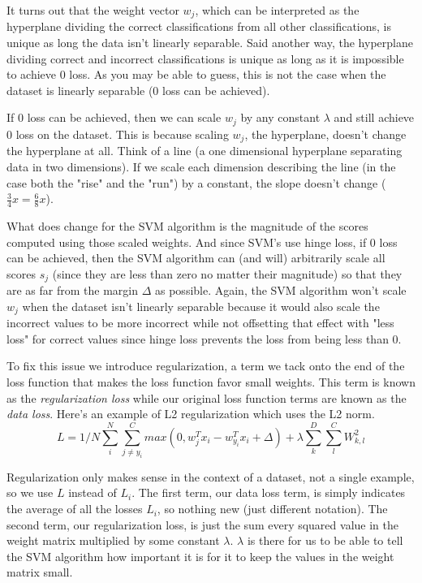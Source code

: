 \documentclass[12pt]{article}
\begin{document}
It turns out that the weight vector $w_j$, which can be interpreted as the hyperplane dividing
the correct classifications from all other classifications, is unique as long the data
isn't linearly separable. Said another way, the hyperplane dividing correct and incorrect 
classifications is unique as long as it is impossible to achieve 0 loss.
As you may be able to guess, this is not the case when the dataset is linearly 
separable (0 loss can be achieved). 

If 0 loss can be achieved, then we can scale $w_j$ by any constant $\lambda$ and still
achieve 0 loss on the dataset. This is because scaling $w_j$, the hyperplane, doesn't change
the hyperplane at all. Think of a line (a one dimensional hyperplane separating data
in two dimensions). If we scale each dimension describing the line (in the case both the "rise"
and the "run") by a constant, the slope doesn't change ($\frac{3}{4}x = \frac{6}{8}x$).

What does change for the SVM algorithm is the magnitude of the scores computed using
those scaled weights. And since SVM's use hinge loss, if 0 loss can be achieved, 
then the SVM algorithm can (and will) arbitrarily scale all scores $s_j$ (since they are less
than zero no matter their magnitude) so that they are as far from the margin $\Delta$ 
as possible. Again, the SVM algorithm won't scale $w_j$ when the dataset isn't linearly 
separable because it would also scale the incorrect values to be more incorrect while not 
offsetting that effect with "less loss" for correct values since hinge loss prevents the 
loss from being less than 0. 

To fix this issue we introduce regularization, a term we tack onto the end of the loss function
that makes the loss function favor small weights. This term is known as the \emph{regularization 
loss} while our original loss function terms are known as the \emph{data loss}. 
Here's an example of L2 regularization which uses the L2 norm. 
\begin{equation}
    L = 1/N \sum_{i}^N \sum_{j \neq y_{i}}^C max(0, w_{j}^T x_i - w_{y_i}^T x_i + \Delta)
    + \lambda \sum_{k}^D \sum_{l}^C W_{k, l}^2
\end{equation}

Regularization only makes sense in the context of a dataset, not a single example, 
so we use $L$ instead of $L_i$. The first term, our data loss term, is simply indicates the average of all
the losses $L_i$, so nothing new (just different notation). The second term, our 
regularization loss, is just the sum every squared value in the weight matrix multiplied
by some constant $\lambda$. $\lambda$ is there for us to be able to tell the SVM algorithm how 
important it is for it to keep the values in the weight matrix small. 
\end{document}
